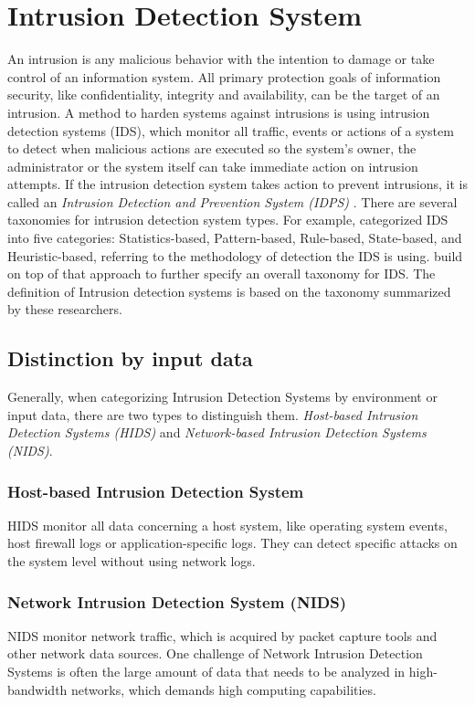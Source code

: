 \documentclass[
    fontsize=12pt,
    headings=small,
    parskip=half,           %
    bibliography=totoc,
    numbers=noenddot,       %
    open=any,               %
    ]{scrreprt}
\begin{document}
\section{Intrusion Detection System}
An intrusion is any malicious behavior with the intention to damage or take control of an information system. All primary protection goals of information security, like confidentiality, integrity and availability, can be the target of an intrusion. A method to harden systems against intrusions is using intrusion detection systems (IDS), which monitor all traffic, events or actions of a system to detect when malicious actions are executed so the system's owner, the administrator or the system itself can take immediate action on intrusion attempts. If the intrusion detection system takes action to prevent intrusions, it is called an \emph{Intrusion Detection and Prevention System (IDPS)} \cite{scarfone2010intrusion}. There are several taxonomies for intrusion detection system types. For example, \cite{Liao2013IntrusionDS} categorized IDS into five categories: Statistics-based, Pattern-based, Rule-based, State-based, and Heuristic-based, referring to the methodology of detection the IDS is using. \cite{khraisat2019survey} build on top of that approach to further specify an overall taxonomy for IDS. The definition of Intrusion detection systems is based on the taxonomy summarized by these researchers.

\subsection{Distinction by input data}
Generally, when categorizing Intrusion Detection Systems by environment or input data, there are two types to distinguish them. 
\emph{Host-based Intrusion Detection Systems (HIDS)} and \emph{Network-based Intrusion Detection Systems (NIDS)}.
\subsubsection{Host-based Intrusion Detection System}
HIDS monitor all data concerning a host system, like operating system events, host firewall logs or application-specific logs. They can detect specific attacks on the system level without using network logs.
\subsubsection{Network Intrusion Detection System (NIDS)}
NIDS monitor network traffic, which is acquired by packet capture tools and other network data sources. One challenge of Network Intrusion Detection Systems is often the large amount of data that needs to be analyzed in high-bandwidth networks, which demands high computing capabilities.
\end{document}
